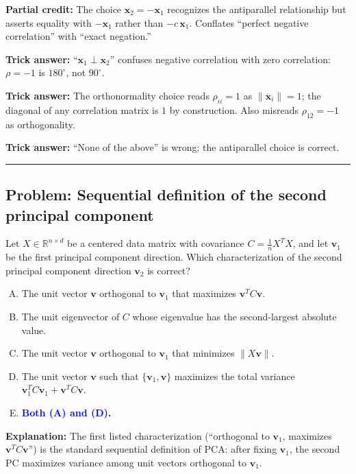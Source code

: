 \documentclass[12pt]{amsart}
\newcommand{\divider}{
  \vspace{-1em}
  \noindent
  \raisebox{-0.15ex}{\textbullet}%
  \hspace{0.5em}%
  \rule[0.5ex]{0.95\textwidth}{1.0pt}%
  \hspace{0.5em}%
  \raisebox{-0.15ex}{\textbullet}%
  \vspace{0em}
}
\begin{document}
\textbf{Partial credit:}
The choice $\mathbf{x}_2 = -\mathbf{x}_1$ recognizes the antiparallel
relationship but asserts equality with $-\mathbf{x}_1$ rather than
$-c\,\mathbf{x}_1$. Conflates ``perfect negative correlation'' with
``exact negation.''

\textbf{Trick answer:}
``$\mathbf{x}_1 \perp \mathbf{x}_2$'' confuses negative correlation with zero
correlation: $\rho = -1$ is $180^\circ$, not $90^\circ$.

\textbf{Trick answer:}
The orthonormality choice reads $\rho_{ii} = 1$ as $\|\mathbf{x}_i\| = 1$;
the diagonal of any correlation matrix is $1$ by construction. Also misreads
$\rho_{12} = -1$ as orthogonality.

\textbf{Trick answer:}
``None of the above'' is wrong; the antiparallel choice is correct.

\divider

\subsection*{Problem: Sequential definition of the second principal component}

Let $X \in \mathbb{R}^{n \times d}$ be a centered data matrix with covariance
$C = \frac{1}{n}X^TX$, and let $\mathbf{v}_1$ be the first principal component
direction. Which characterization of the second principal component direction
$\mathbf{v}_2$ is correct?

\begin{enumerate}[(A)]
\item The unit vector $\mathbf{v}$ orthogonal to $\mathbf{v}_1$ that maximizes $\mathbf{v}^T C \mathbf{v}$.
\item The unit eigenvector of $C$ whose eigenvalue has the second-largest absolute value.
\item The unit vector $\mathbf{v}$ orthogonal to $\mathbf{v}_1$ that minimizes $\|X\mathbf{v}\|$.
\item The unit vector $\mathbf{v}$ such that $\{\mathbf{v}_1, \mathbf{v}\}$ maximizes
the total variance $\mathbf{v}_1^T C \mathbf{v}_1 + \mathbf{v}^T C \mathbf{v}$.
\item \textcolor{blue}{\textbf{Both (A) and (D).}}
\end{enumerate}

\textbf{Explanation:}
The first listed characterization (``orthogonal to $\mathbf{v}_1$, maximizes
$\mathbf{v}^TC\mathbf{v}$'') is the standard sequential definition of PCA:
after fixing $\mathbf{v}_1$, the second PC maximizes variance among unit
vectors orthogonal to $\mathbf{v}_1$.
\end{document}
